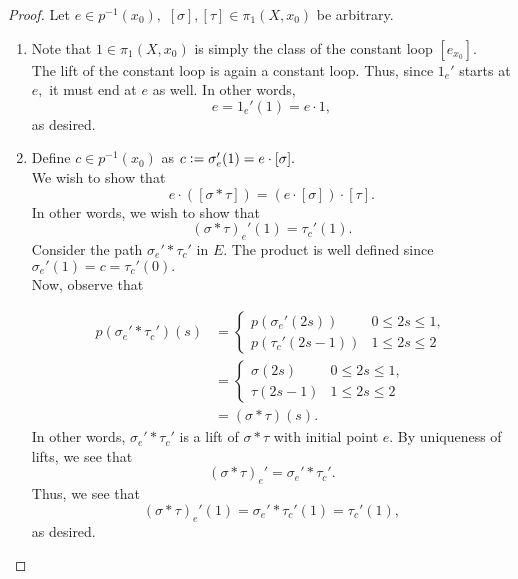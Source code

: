\documentclass[12pt]{article}
\begin{document}
\begin{proof} 
	Let $e \in p^{-1}(x_0),$ $[\sigma], [\tau] \in \pi_1(X, x_0)$ be arbitrary.
	\begin{enumerate}
		\item Note that $1 \in \pi_1(X, x_0)$ is simply the class of the constant loop $[e_{x_0}].$\\
		The lift of the constant loop is again a constant loop. Thus, since $1_e'$ starts at $e,$ it must end at $e$ as well. In other words,
		\begin{equation*} 
			e = 1_e'(1) = e\cdot 1,
		\end{equation*}
		as desired.
		\item Define $c \in p^{-1}(x_0)$ as $c \vcentcolon= \sigma_e'(1) = e\cdot[\sigma].$\\
		We wish to show that
		\begin{equation*} 
			e\cdot([\sigma*\tau]) = (e \cdot [\sigma])\cdot[\tau].
		\end{equation*}
		In other words, we wish to show that
		\begin{equation*} 
			(\sigma*\tau)_e'(1) = \tau_c'(1).
		\end{equation*}
		Consider the path $\sigma_e'*\tau_c'$ in $E.$ The product is well defined since $\sigma_e'(1) = c = \tau_c'(0).$\\
		Now, observe that

		\begin{align*} 
			p(\sigma_e'*\tau_c')(s) &= \begin{cases}
				p(\sigma_e'(2s)) & 0 \le 2s \le 1,\\
				p(\tau_c'(2s - 1)) & 1 \le 2s \le 2
			\end{cases}\\
			&= \begin{cases}
				\sigma(2s) & 0 \le 2s \le 1,\\
				\tau(2s - 1) & 1 \le 2s \le 2
			\end{cases}\\
			&= (\sigma*\tau)(s).
		\end{align*}
		In other words, $\sigma_e'*\tau_c'$ is a lift of $\sigma*\tau$ with initial point $e.$ By uniqueness of lifts, we see that
		\begin{equation*} 
			(\sigma*\tau)_e' = \sigma_e'*\tau_c'.
		\end{equation*}
		Thus, we see that
		\begin{equation*} 
			(\sigma*\tau)_e'(1) = \sigma_e'*\tau_c'(1) = \tau_c'(1),
		\end{equation*}
		as desired. \qedhere
	\end{enumerate}
\end{proof}
\end{document}
